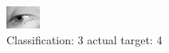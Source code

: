\begin{figure}[h!]
\begin{center}
\includegraphics[width=0.60\columnwidth]{figures/ID3056_class_3_target_4.png}
\end{center}
\caption{ Classification: 3 actual target: 4}
\label{fig:ID3056_class_3_target_4}
\end{figure}

